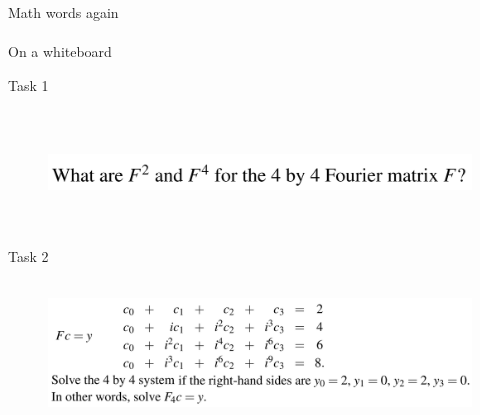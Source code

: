 \documentclass[aspectratio=169]{beamer}
\begin{document}
\begin{frame}[t]{Math words again}
\framesubtitle{}
\Large
    On a whiteboard
\end{frame}

\begin{frame}[t]{Task 1}
    \framesubtitle{}
    \begin{figure}[H]
        \centering\includegraphics[height=3cm,width=1\textwidth,keepaspectratio]{1.png}
        \label{fig:1.png}
    \end{figure}
\end{frame}

\begin{frame}[t]{Task 2}
    \framesubtitle{}
    \vspace{-0.5cm}
    \begin{figure}[H]
        \centering\includegraphics[height=3.5cm,width=1\textwidth,keepaspectratio]{2.png}
        \label{fig:2.png}
    \end{figure}
\end{frame}
\end{document}
